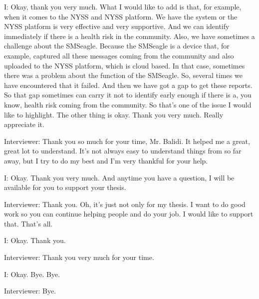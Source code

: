 I: Okay, thank you very much. What I would like to add is that, for example, when it comes to the NYSS and NYSS platform. We have the system or the NYSS platform is very effective and very supportive. And we can identify immediately if there is a health risk in the community. Also, we have sometimes a challenge about the SMSeagle. Because the SMSeagle is a device that, for example, captured all these messages coming from the community and also uploaded to the NYSS platform, which is cloud based. In that case, sometimes there was a problem about the function of the SMSeagle. So, several times we have encountered that it failed. And then we have got a gap to get these reports. So that gap sometimes can carry it not to identify early enough if there is a, you know, health risk coming from the community. So that's one of the issue I would like to highlight. The other thing is okay. Thank you very much. Really appreciate it.

Interviewer:   Thank you so much for your time, Mr. Balidi. It helped me a great, great lot to understand. It's not always easy to understand things from so far away, but I try to do my best and I'm very thankful for your help. 

I: Okay. Thank you very much. And anytime you have a question, I will be available for you to support your thesis.

Interviewer:  Thank you. Oh, it's just not only for my thesis. I want to do good work so you can continue helping people and do your job. I would like to support that. That's all. 

I: Okay. Thank you. 

Interviewer:  Thank you very much for your time. 

I: Okay. Bye. Bye. 

Interviewer:  Bye.
